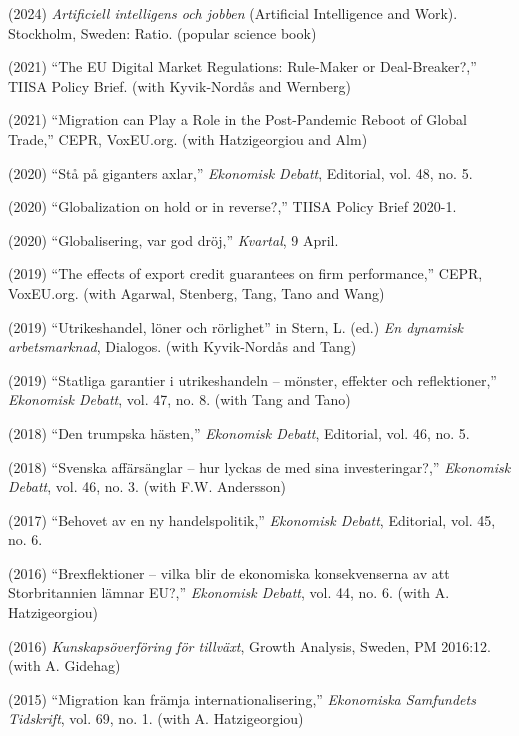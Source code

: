 \documentclass[11pt,a4paper]{article}
\newcommand{\publication}[1]{\item #1}
\begin{document}
\begin{enumerate}[label={[\arabic*]}]
\publication{(2024) \textit{Artificiell intelligens och jobben} (Artificial Intelligence and Work). Stockholm, Sweden: Ratio. (popular science book)}

\publication{(2021) ``The EU Digital Market Regulations: Rule-Maker or Deal-Breaker?,'' TIISA Policy Brief. (with Kyvik-Nordås and Wernberg)}

\publication{(2021) ``Migration can Play a Role in the Post-Pandemic Reboot of Global Trade,'' CEPR, VoxEU.org. (with Hatzigeorgiou and Alm)}

\publication{(2020) ``Stå på giganters axlar,'' \textit{Ekonomisk Debatt}, Editorial, vol. 48, no. 5.}

\publication{(2020) ``Globalization on hold or in reverse?,'' TIISA Policy Brief 2020-1.}

\publication{(2020) ``Globalisering, var god dröj,'' \textit{Kvartal}, 9 April.}

\publication{(2019) ``The effects of export credit guarantees on firm performance,'' CEPR, VoxEU.org. (with Agarwal, Stenberg, Tang, Tano and Wang)}

\publication{(2019) ``Utrikeshandel, löner och rörlighet'' in Stern, L. (ed.) \textit{En dynamisk arbetsmarknad}, Dialogos. (with Kyvik-Nordås and Tang)}

\publication{(2019) ``Statliga garantier i utrikeshandeln -- mönster, effekter och reflektioner,'' \textit{Ekonomisk Debatt}, vol. 47, no. 8. (with Tang and Tano)}

\publication{(2018) ``Den trumpska hästen,'' \textit{Ekonomisk Debatt}, Editorial, vol. 46, no. 5.}

\publication{(2018) ``Svenska affärsänglar -- hur lyckas de med sina investeringar?,'' \textit{Ekonomisk Debatt}, vol. 46, no. 3. (with F.W. Andersson)}

\publication{(2017) ``Behovet av en ny handelspolitik,'' \textit{Ekonomisk Debatt}, Editorial, vol. 45, no. 6.}

\publication{(2016) ``Brexflektioner -- vilka blir de ekonomiska konsekvenserna av att Storbritannien lämnar EU?,'' \textit{Ekonomisk Debatt}, vol. 44, no. 6. (with A. Hatzigeorgiou)}

\publication{(2016) \textit{Kunskapsöverföring för tillväxt}, Growth Analysis, Sweden, PM 2016:12. (with A. Gidehag)}

\publication{(2015) ``Migration kan främja internationalisering,'' \textit{Ekonomiska Samfundets Tidskrift}, vol. 69, no. 1. (with A. Hatzigeorgiou)}


\end{enumerate}
\end{document}
